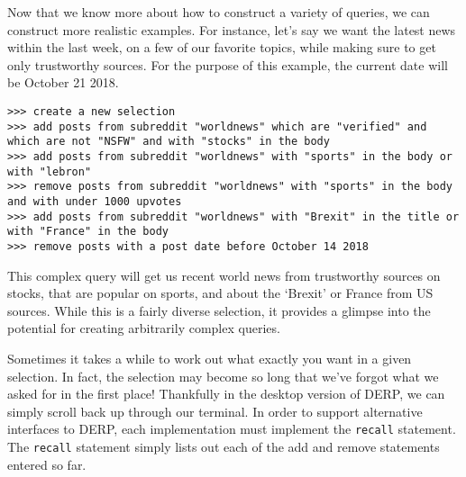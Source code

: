 Now that we know more about how to construct a variety of queries, we can construct more realistic examples. For instance, let’s say we want the latest news within the last week, on a few of our favorite topics, while making sure to get only trustworthy sources. For the purpose of this example, the current date will be October 21 2018.
\newline\begin{minipage}{\linewidth}\begin{lstlisting}
>>> create a new selection
>>> add posts from subreddit "worldnews" which are "verified" and which are not "NSFW" and with "stocks" in the body
>>> add posts from subreddit "worldnews" with "sports" in the body or with "lebron"
>>> remove posts from subreddit "worldnews" with "sports" in the body and with under 1000 upvotes
>>> add posts from subreddit "worldnews" with "Brexit" in the title or with "France" in the body
>>> remove posts with a post date before October 14 2018
\end{lstlisting}\end{minipage}
This complex query will get us recent world news from trustworthy sources on stocks, that are popular on sports, and about the ‘Brexit’ or France from US sources. While this is a fairly diverse selection, it provides a glimpse into the potential for creating arbitrarily complex queries.

Sometimes it takes a while to work out what exactly you want in a given selection. In fact, the selection may become so long that we’ve forgot what we asked for in the first place! Thankfully in the desktop version of DERP, we can simply scroll back up through our terminal. In order to support alternative interfaces to DERP, each implementation must implement the \texttt{recall} statement. The \texttt{recall} statement simply lists out each of the add and remove statements entered so far.
